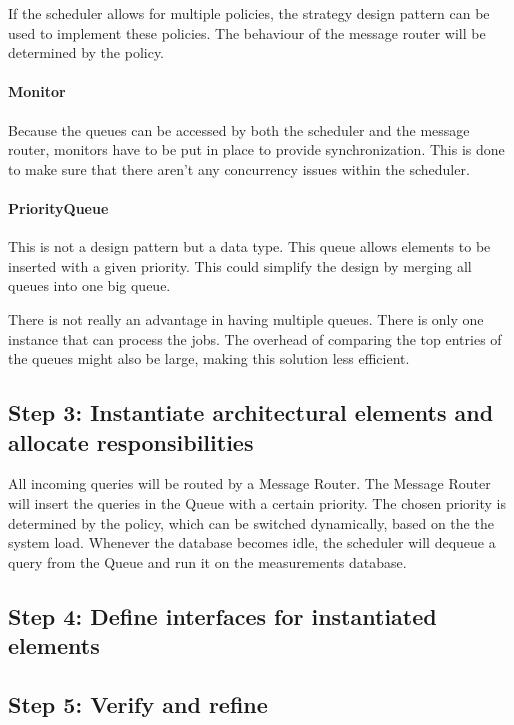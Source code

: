 \npar If the scheduler allows for multiple policies, the strategy design pattern
can be used to implement these policies. The behaviour of the message router
will be determined by the policy.

\paragraph{Monitor} 

\npar Because the queues can be accessed by both the scheduler and the message
router, monitors have to be put in place to provide synchronization. This is
done to make sure that there aren't any concurrency issues within the scheduler. 

\paragraph{PriorityQueue}

\npar This is not a design pattern but a data type. This queue allows elements
to be inserted with a given priority. This could simplify the design by merging
all queues into one big queue.

\npar There is not really an advantage in having multiple queues. There is only
one instance that can process the jobs. The overhead of comparing the top
entries of the queues might also be large, making this solution less efficient. 

\subsection{Step 3: Instantiate architectural elements and allocate responsibilities}
\label{add:it3/elements}

\npar All incoming queries will be routed by a Message Router. The Message
Router will insert the queries in the Queue with a certain priority. The chosen
priority is determined by the policy, which can be switched dynamically, based
on the the system load. Whenever the database becomes idle, the scheduler will
dequeue a query from the Queue and run it on the measurements database. 

\subsection{Step 4: Define interfaces for instantiated elements}
\label{add:it3/interfaces}


\subsection{Step 5: Verify and refine}
\label{add:it3/verification}

